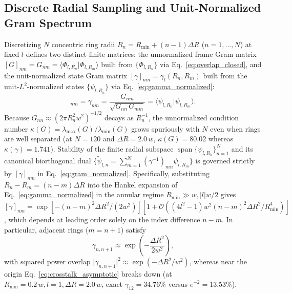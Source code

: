 \documentclass[aps,pra,onecolumn,notitlepage,11pt,tightenlines,nofootinbib,floatfix,longbibliography]{revtex4-2}
\theoremstyle{remark}
\newcommand{\braket}[2]{\langle #1 | #2 \rangle}
\newcommand{\abs}[1]{\lvert #1 \rvert}
\begin{document}
\subsection{Discrete Radial Sampling and Unit-Normalized Gram Spectrum}
\label{subsec:gram_sampling}

Discretizing $N$ concentric ring radii $R_n = R_{\min} + (n-1)\Delta R$ ($n = 1,\dots,N$) at fixed $l$ defines two distinct finite matrices: the unnormalized frame Gram matrix $[G]_{nm} = G_{nm} = \braket{\Phi_{l,R_n}}{\Phi_{l,R_m}}$ built from $\{\Phi_{l,R_n}\}$ via Eq.~\eqref{eq:overlap_closed}, and the unit-normalized state Gram matrix $[\gamma]_{nm} = \gamma_l(R_n,R_m)$ built from the unit-$L^2$-normalized states $\{\psi_{l,R_n}\}$ via Eq.~\eqref{eq:gamma_normalized}:
\begin{equation}
[\gamma]_{nm} = \gamma_{nm} = \frac{G_{nm}}{\sqrt{G_{nn}\,G_{mm}}} = \braket{\psi_{l,R_n}}{\psi_{l,R_m}}.
\label{eq:gram_normalized}
\end{equation}
Because $G_{nn} \approx (2\pi R_n^2 w^2)^{-1/2}$ decays as $R_n^{-1}$, the unnormalized condition number $\kappa(G) = \lambda_{\max}(G)/\lambda_{\min}(G)$ grows spuriously with $N$ even when rings are well separated (at $N = 120$ and $\Delta R = 2.0\,w$, $\kappa(G) = 80.02$ whereas $\kappa(\gamma) = 1.741$). Stability of the finite radial subspace $\operatorname{span}\{\psi_{l,R_n}\}_{n=1}^N$ and its canonical biorthogonal dual $\{\tilde{\psi}_{l,n} = \sum_{m=1}^N (\gamma^{-1})_{mn}\psi_{l,R_m}\}$ is governed strictly by $[\gamma]_{nm}$ in Eq.~\eqref{eq:gram_normalized}. Specifically, substituting $R_n - R_m = (n-m)\Delta R$ into the Hankel expansion of Eq.~\eqref{eq:gamma_normalized} in the annular regime $R_{\min} \gg w, \abs{l}w/2$ gives $[\gamma]_{nm} = \exp[-(n-m)^2\Delta R^2/(2w^2)][1 + \mathcal{O}((4l^2-1)w^2(n-m)^2\Delta R^2/R_{\min}^4)]$, which depends at leading order solely on the index difference $n - m$. In particular, adjacent rings ($m = n+1$) satisfy
\begin{equation}
\gamma_{n,n+1} \approx \exp\!\left(-\frac{\Delta R^2}{2w^2}\right),
\label{eq:crosstalk_asymptotic}
\end{equation}
with squared power overlap $\abs{\gamma_{n,n+1}}^2 \approx \exp(-\Delta R^2/w^2)$, whereas near the origin Eq.~\eqref{eq:crosstalk_asymptotic} breaks down (at $R_{\min} = 0.2\,w, l = 1, \Delta R = 2.0\,w$, exact $\gamma_{12} = 34.76\%$ versus $e^{-2} = 13.53\%$).
\end{document}
